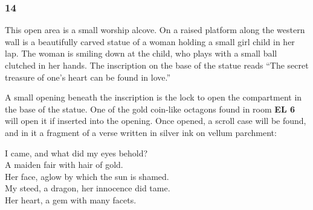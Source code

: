 \documentclass[palace_of_the_silver_princess]{subfiles}
\begin{document}
\subsubsection{14}
\begin{quotebox}
    This open area is a small worship alcove. On a raised platform
    along the western wall is a beautifully carved statue of a woman
    holding a small girl child in her lap. The woman is smiling down at
    the child, who plays with a small ball clutched in her hands. The
    inscription on the base of the statue reads “The secret treasure of
    one’s heart can be found in love.”
\end{quotebox}

A small opening beneath the inscription is the lock to open the
compartment in the base of the statue. One of the gold coin-like
octagons found in room \textbf{EL 6} will open it if inserted into the
opening.  Once opened, a scroll case will be found, and in it a fragment
of a verse written in silver ink on vellum parchment:

\begin{commentbox}{}
    I came, and what did my eyes behold? \\
    A maiden fair with hair of gold. \\
    Her face, aglow by which the sun is shamed. \\
    My steed, a dragon, her innocence did tame. \\
    Her heart, a gem with many facets.
\end{commentbox}
\end{document}
